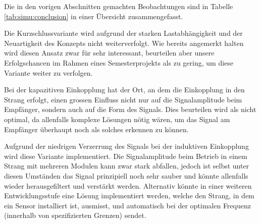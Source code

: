 Die  in  den  vorigen  Abschnitten gemachten  Beobachtungen  sind  in  Tabelle
\ref{tab:simu:conclusion} in einer \"Ubersicht zusammengefasst.

Die Kurzschlussvariante  wird aufgrund der starken  Lastabh\"angigkeit und der
Neuartigkeit des  Konzepts nicht weiterverfolgt. Wie bereits  angemerkt halten
wird  diesen  Ansatz  zwar  f\"ur sehr  interessant,  beurteilen  aber  unsere
Erfolgschancen  im  Rahmen eines  Semesterprojekts  als  zu gering,  um  diese
Variante weiter zu verfolgen.

Bei der  kapazitiven Einkopplung hat  der Ort, an  dem die Einkopplung  in den
Strang erfolgt, einen grossen Einfluss  nicht nur auf die Signalamplitude beim
Empf\"anger, sondern auch  auf die Form des Signals. Dies  beurteilen wird als
nicht  optimal, da  allenfalls  komplexe L\"osungen  n\"otig  w\"aren, um  das
Signal am Empf\"anger \"uberhaupt noch als solches erkennen zu k\"onnen.

Aufgrund der niedrigen  Verzerrung des Signals bei  der induktiven Einkopplung
wird diese  Variante implementiert. Die Signalamplitude beim  Betrieb in einem
Strang mit mehreren Modulen kann zwar  stark abfallen, jedoch ist selbst unter
diesen  Umst\"anden  das Signal  prinzipiell  noch  sehr sauber  und  k\"onnte
allenfalls wieder herausgefiltert  und verst\"arkt werden. Alternativ k\"onnte
in einer weiteren Entwicklungsstufe eine L\"osung implementiert werden, welche
den Strang, in  dem ein Sensor installiert ist, ausmisst,  und automatisch bei
der optimalen Frequenz (innerhalb von spezifizierten Grenzen) sendet.

\vspace*{2em}

